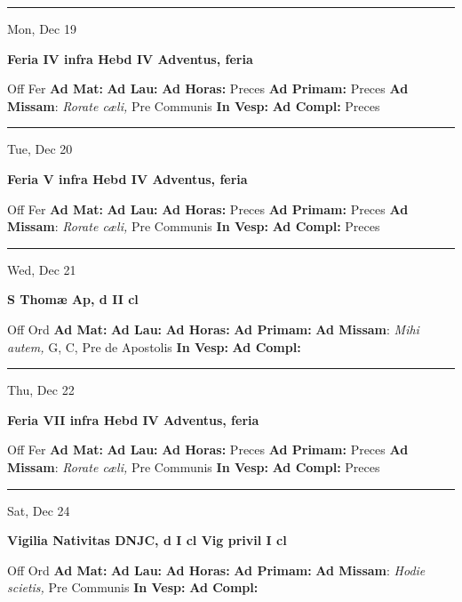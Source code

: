 \documentclass[letterpaper, 10pt]{article}
\begin{document}
\hrule
\begin{center}
Mon, Dec 19
\end{center}\textbf{ \large Feria IV infra Hebd IV Adventus, \textnormal{\normalsize feria}}
\begin{justify}
Off Fer
\textbf{Ad Mat: }
\textbf{Ad Lau: }
\textbf{Ad Horas: }Preces
\textbf{Ad Primam: }Preces
\textbf{Ad Missam}: \textit{Rorate cæli,} Pre Communis
\textbf{In Vesp: }
\textbf{Ad Compl: }Preces\end{justify}



\hrule
\begin{center}
Tue, Dec 20
\end{center}\textbf{ \large Feria V infra Hebd IV Adventus, \textnormal{\normalsize feria}}
\begin{justify}
Off Fer
\textbf{Ad Mat: }
\textbf{Ad Lau: }
\textbf{Ad Horas: }Preces
\textbf{Ad Primam: }Preces
\textbf{Ad Missam}: \textit{Rorate cæli,} Pre Communis
\textbf{In Vesp: }
\textbf{Ad Compl: }Preces\end{justify}



\hrule
\begin{center}
Wed, Dec 21
\end{center}\textbf{ \large S Thomæ Ap, \textnormal{\normalsize d II cl}}
\begin{justify}
Off Ord
\textbf{Ad Mat: }
\textbf{Ad Lau: }
\textbf{Ad Horas: }
\textbf{Ad Primam: }
\textbf{Ad Missam}: \textit{Mihi autem,} G, C, Pre de Apostolis
\textbf{In Vesp: }
\textbf{Ad Compl: }\end{justify}



\hrule
\begin{center}
Thu, Dec 22
\end{center}\textbf{ \large Feria VII infra Hebd IV Adventus, \textnormal{\normalsize feria}}
\begin{justify}
Off Fer
\textbf{Ad Mat: }
\textbf{Ad Lau: }
\textbf{Ad Horas: }Preces
\textbf{Ad Primam: }Preces
\textbf{Ad Missam}: \textit{Rorate cæli,} Pre Communis
\textbf{In Vesp: }
\textbf{Ad Compl: }Preces\end{justify}



\hrule
\begin{center}
Sat, Dec 24
\end{center}\textbf{ \large Vigilia Nativitas DNJC, \textnormal{\normalsize d I cl Vig privil I cl}}
\begin{justify}
Off Ord
\textbf{Ad Mat: }
\textbf{Ad Lau: }
\textbf{Ad Horas: }
\textbf{Ad Primam: }
\textbf{Ad Missam}: \textit{Hodie scietis,} Pre Communis
\textbf{In Vesp: }
\textbf{Ad Compl: }\end{justify}
\end{document}
